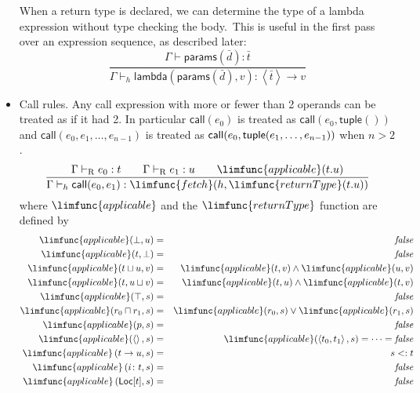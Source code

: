 \documentclass[12pt]{article}
\begin{document}
\begin{itemize}
When a return type is declared, we can determine the type of a lambda
expression without type checking the body.\ This is useful in the first pass
over an expression sequence, as described later:%
\begin{equation*}
\frac{\Gamma \vdash \mathsf{params}(\bar{d}):\bar{t}}{\Gamma \vdash _{h}%
\mathsf{lambda}(\mathsf{params}(\bar{d}),v):\left\langle \bar{t}%
\right\rangle \rightarrow v}
\end{equation*}

\item Call rules. Any call expression with more or fewer than 2 operands can
be treated as if it had 2. In particular $\mathsf{call}(e_{0})$ is treated
as $\mathsf{call}(e_{0},\mathsf{tuple}())$ and $\mathsf{call}%
(e_{0},e_{1},\ldots ,e_{n-1})$ is treated as $\mathsf{call}(e_{0},\mathsf{%
tuple}(e_{1},\ldots ,e_{n-1}))$ when $n>2$.%
\begin{equation*}
\frac{\Gamma \vdash _{\mathrm{R}}e_{0}:t\qquad \Gamma \vdash _{\mathrm{R}%
}e_{1}:u\qquad \limfunc{applicable}(t.u)}{\Gamma \vdash _{h}\mathsf{call}%
(e_{0},e_{1}):\limfunc{fetch}(h,\limfunc{returnType}(t.u))}
\end{equation*}%
where $\limfunc{applicable}$ and the $\limfunc{returnType}$ function are
defined by%
\begin{eqnarray*}
\limfunc{applicable}(\bot ,u) &=&\mathit{false} \\
\limfunc{applicable}(t,\bot ) &=&\mathit{false} \\
\limfunc{applicable}(t\sqcup u,v) &=&\limfunc{applicable}(t,v)\wedge 
\limfunc{applicable}(u,v) \\
\limfunc{applicable}(t,u\sqcup v) &=&\limfunc{applicable}(t,u)\wedge 
\limfunc{applicable}(t,v) \\
\limfunc{applicable}(\top ,s) &=&\mathit{false} \\
\limfunc{applicable}(r_{0}\sqcap r_{1},s) &=&\limfunc{applicable}%
(r_{0},s)\vee \limfunc{applicable}(r_{1},s) \\
\limfunc{applicable}(p,s) &=&\mathit{false} \\
\limfunc{applicable}(\left\langle {}\right\rangle ,s) &=&\limfunc{applicable}%
(\left\langle t_{0},t_{1}\right\rangle ,s)=\cdots =\mathit{false} \\
\limfunc{applicable}\left( t\rightarrow u,s\right) &=&s<:t \\
\limfunc{applicable}\left( i\colon t,s\right) &=&\mathit{false} \\
\limfunc{applicable}\left( \mathsf{Loc}[t],s\right) &=&\mathit{false}

\end{eqnarray*}
\end{itemize}
\end{document}

